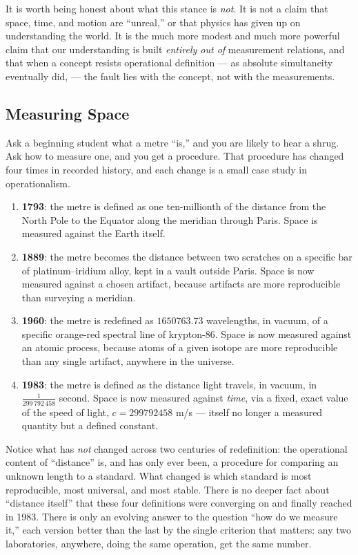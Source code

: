It is worth being honest about what this stance is \emph{not}. It is not a
claim that space, time, and motion are ``unreal,'' or that physics has given up
on understanding the world. It is the much more modest and much more powerful
claim that our understanding is built \emph{entirely out of} measurement
relations, and that when a concept resists operational definition --- as
absolute simultaneity eventually did,  --- the fault lies with the concept, not
with the measurements.

\subsection{Measuring Space}

Ask a beginning student what a metre ``is,'' and you are likely to hear a
shrug. Ask how to measure one, and you get a procedure. That procedure has
changed four times in recorded history, and each change is a small case study
in operationalism.

\begin{enumerate}
    \item \textbf{1793}: the metre is defined as one ten-millionth of the
        distance from the North Pole to the Equator along the meridian through
        Paris. Space is measured against the Earth itself.
  \item \textbf{1889}: the metre becomes the distance between two scratches on
      a specific bar of platinum--iridium alloy, kept in a vault outside Paris.
        Space is now measured against a chosen artifact, because artifacts are
        more reproducible than surveying a meridian.
  \item \textbf{1960}: the metre is redefined as \(1650763.73\)
      wavelengths, in vacuum, of a specific orange-red spectral line of
        krypton-86. Space is now measured against an atomic process, because
        atoms of a given isotope are more reproducible than any single
        artifact, anywhere in the universe.
  \item \textbf{1983}: the metre is defined as the distance light travels, in
      vacuum, in $\tfrac{1}{299\,792\,458}$ second.  Space is now measured
        against \emph{time}, via a fixed, exact value of the speed of light, $c
        = 299792458$ \unit{m/s} --- itself no longer a measured quantity but a
        defined constant.
\end{enumerate}

Notice what has \emph{not} changed across two centuries of redefinition: the
operational content of ``distance'' is, and has only ever been, a procedure for
comparing an unknown length to a standard. What changed is which standard is
most reproducible, most universal, and most stable. There is no deeper fact
about ``distance itself'' that these four definitions were converging on and
finally reached in 1983. There is only an evolving answer to the question ``how
do we measure it,'' each version better than the last by the single criterion
that matters: any two laboratories, anywhere, doing the same operation, get the
same number.

